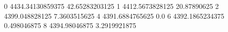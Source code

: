 0 4434.34130859375 42.65283203125
1 4412.5673828125 20.87890625
2 4399.048828125 7.3603515625
4 4391.6884765625 0.0
6 4392.1865234375 0.498046875
8 4394.98046875 3.2919921875
